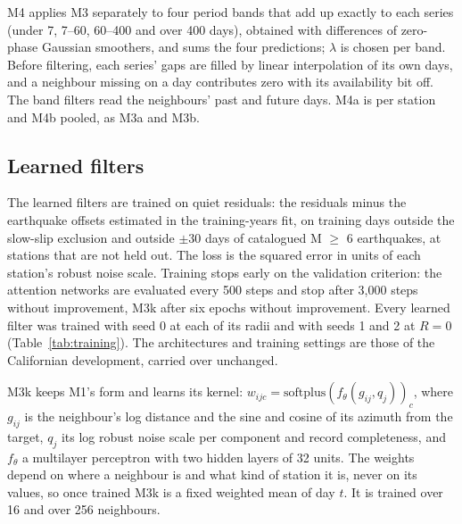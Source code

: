 \documentclass[preprint,12pt,authoryear]{elsarticle}
\begin{document}
M4 applies M3 separately to four period bands that add up exactly to each series (under 7, 7--60, 60--400 and over 400 days), obtained with differences of zero-phase Gaussian smoothers, and sums the four predictions; $\lambda$ is chosen per band. Before filtering, each series' gaps are filled by linear interpolation of its own days, and a neighbour missing on a day contributes zero with its availability bit off. The band filters read the neighbours' past and future days. M4a is per station and M4b pooled, as M3a and M3b.

\subsection{Learned filters}
\label{sec:filters-learned}

The learned filters are trained on quiet residuals: the residuals minus the earthquake offsets estimated in the training-years fit, on training days outside the slow-slip exclusion and outside $\pm 30$ days of catalogued M $\ge$ 6 earthquakes, at stations that are not held out. The loss is the squared error in units of each station's robust noise scale. Training stops early on the validation criterion: the attention networks are evaluated every 500 steps and stop after 3,000 steps without improvement, M3k after six epochs without improvement. Every learned filter was trained with seed 0 at each of its radii and with seeds 1 and 2 at $R = 0$ (Table~\ref{tab:training}). The architectures and training settings are those of the Californian development, carried over unchanged.

M3k keeps M1's form and learns its kernel: $w_{ijc} = \mathrm{softplus}(f_\theta(g_{ij}, q_j))_c$, where $g_{ij}$ is the neighbour's log distance and the sine and cosine of its azimuth from the target, $q_j$ its log robust noise scale per component and record completeness, and $f_\theta$ a multilayer perceptron with two hidden layers of 32 units. The weights depend on where a neighbour is and what kind of station it is, never on its values, so once trained M3k is a fixed weighted mean of day $t$. It is trained over 16 and over 256 neighbours.
\end{document}
